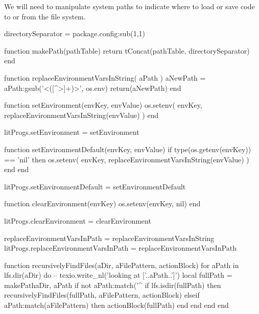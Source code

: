 
\startchapter[title=Manipulating of system paths]

We will need to manipulate system paths to indicate where to load or save 
code to or from the file system.

\startMkIVCode
\def\setEnvironment#1#2{
  \directlua{
    thirddata.literateProgs.setEnvironment('#1', '#2')
  }
}

\def\setEnvironmentDefault#1#2{
  \directlua{
    thirddata.literateProgs.setEnvironmentDefault('#1', '#2')
  }
}

\def\clearEnvironemtn#1{
  \directlua{
    thirddata.literateProgs.clearEnvironment('#1')
  }
}
\stopMkIVCode


\startLuaCode
directorySeparator = package.config:sub(1,1)

function makePath(pathTable)
  return tConcat(pathTable, directorySeparator)
end

function replaceEnvironmentVarsInString( aPath )
  aNewPath = aPath:gsub('<([^>]+)>', os.env)
  return(aNewPath)
end

function setEnvironment(envKey, envValue)
  os.setenv(
    envKey,
    replaceEnvironmentVarsInString(envValue)
  )
end

litProgs.setEnvironment = setEnvironment

function setEnvironmentDefault(envKey, envValue)
  if type(os.getenv(envKey)) == 'nil' then
    os.setenv(
      envKey,
      replaceEnvironmentVarsInString(envValue)
    )
  end
end

litProgs.setEnvironmentDefault = setEnvironmentDefault

function clearEnvironment(envKey)
  os.setenv(envKey, nil)
end

litProgs.clearEnvironment = clearEnvironment
\stopLuaCode


\startLuaCode

replaceEnvironmentVarsInPath = replaceEnvironmentVarsInString
litProgs.replaceEnvironmentVarsInPath = replaceEnvironmentVarsInPath

function recursivelyFindFiles(aDir, aFilePattern, actionBlock)
  for aPath in lfs.dir(aDir) do
--    texio.write_nl('looking at ['..aPath..']')
    local fullPath = makePath{aDir, aPath}
    if not aPath:match('^%
      if lfs.isdir(fullPath) then
        recursivelyFindFiles(fullPath, aFilePattern, actionBlock)
      elseif aPath:match(aFilePattern) then
        actionBlock(fullPath)
      end
    end
  end
end

\stopLuaCode
